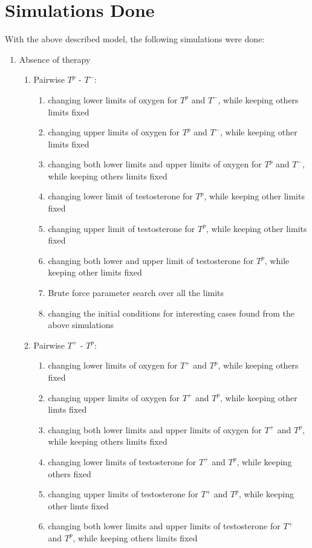 \section{Simulations Done}
With the above described model, the following simulations were done:
\begin{enumerate}
  \item Absence of therapy
  \begin{enumerate}
    \item Pairwise $T^p$ - $T^-$:
    \begin{enumerate}
      \item changing lower limits of oxygen for $T^p$ and $T^-$, while keeping others limits fixed
      \item changing upper limits of oxygen for $T^p$ and $T^-$, while keeping other limits fixed
      \item changing both lower limits and upper limits of oxygen for $T^p$ and $T^-$, while keeping others limits fixed
      \item changing lower limit of testosterone for $T^p$, while keeping other limits fixed
      \item changing upper limit of testosterone for $T^p$, while keeping other limits fixed
      \item changing both lower and upper limit of testosterone for $T^p$, while keeping other limits fixed
      \item Brute force parameter search over all the limits
      \item changing the initial conditions for interesting cases found from the above simulations
    \end{enumerate}
    \item Pairwise $T^+$ - $T^p$:
    \begin{enumerate}
      \item changing lower limits of oxygen for $T^+$ and $T^p$, while keeping others fixed
      \item changing upper limits of oxygen for $T^+$ and $T^p$, while keeping other limts fixed
      \item changing both lower limits and upper limits of oxygen for $T^+$ and $T^p$, while keeping others limits fixed
      \item changing lower limits of testosterone for $T^+$ and $T^p$, while keeping others fixed
      \item changing upper limits of testosterone for $T^+$ and $T^p$, while keeping other limts fixed
      \item changing both lower limits and upper limits of testosterone for $T^+$ and $T^p$, while keeping others limits fixed

\end{enumerate}
\end{enumerate}
\end{enumerate}
